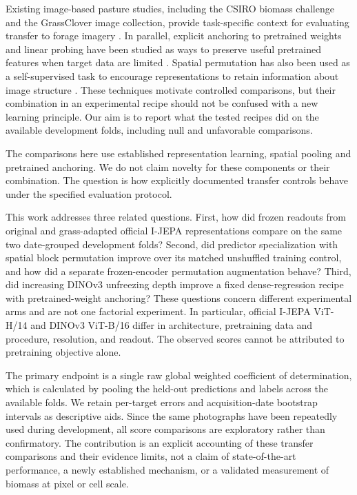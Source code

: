 \documentclass[pdflatex,a4paper,sn-nature]{sn-jnl}
\begin{document}
Existing image-based pasture studies, including the CSIRO biomass challenge and the GrassClover image collection, provide task-specific context for evaluating transfer to forage imagery \cite{csiro2025image2biomass,skovsen2019grassclover}. In parallel, explicit anchoring to pretrained weights and linear probing have been studied as ways to preserve useful pretrained features when target data are limited \cite{li2018l2sp,kumar2022lpft}. Spatial permutation has also been used as a self-supervised task to encourage representations to retain information about image structure \cite{noroozi2016jigsaw}. These techniques motivate controlled comparisons, but their combination in an experimental recipe should not be confused with a new learning principle. Our aim is to report what the tested recipes did on the available development folds, including null and unfavorable comparisons.

The comparisons here use established representation learning, spatial pooling and pretrained anchoring. We do not claim novelty for these components or their combination. The question is how explicitly documented transfer controls behave under the specified evaluation protocol.

This work addresses three related questions. First, how did frozen readouts from original and grass-adapted official I-JEPA representations compare on the same two date-grouped development folds? Second, did predictor specialization with spatial block permutation improve over its matched unshuffled training control, and how did a separate frozen-encoder permutation augmentation behave? Third, did increasing DINOv3 unfreezing depth improve a fixed dense-regression recipe with pretrained-weight anchoring? These questions concern different experimental arms and are not one factorial experiment. In particular, official I-JEPA ViT-H/14 and DINOv3 ViT-B/16 differ in architecture, pretraining data and procedure, resolution, and readout. The observed scores cannot be attributed to pretraining objective alone.

The primary endpoint is a single raw global weighted coefficient of determination, which is calculated by pooling the held-out predictions and labels across the available folds. We retain per-target errors and acquisition-date bootstrap intervals as descriptive aids. Since the same photographs have been repeatedly used during development, all score comparisons are exploratory rather than confirmatory. The contribution is an explicit accounting of these transfer comparisons and their evidence limits, not a claim of state-of-the-art performance, a newly established mechanism, or a validated measurement of biomass at pixel or cell scale.
\end{document}
